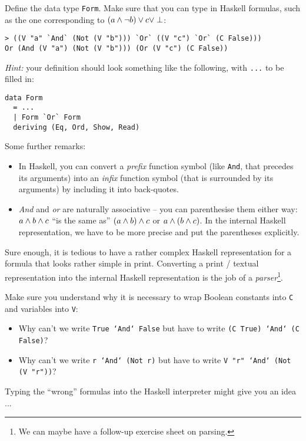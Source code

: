 \documentclass[english]{article}
\begin{document}
\begin{exo}\label{exo:formula_representation}
Define the data type \texttt{Form}. Make sure that you can type in Haskell
formulas, such as the one
corresponding to $(a \land \lnot b) \lor c \lor \perp$:
\begin{lstlisting}
> ((V "a" `And` (Not (V "b"))) `Or` ((V "c") `Or` (C False)))
Or (And (V "a") (Not (V "b"))) (Or (V "c") (C False))
\end{lstlisting}

\emph{Hint:} your definition should look something like the following, with \texttt{...} to
be filled in:
\begin{lstlisting}
data Form
  = ...
  | Form `Or` Form
  deriving (Eq, Ord, Show, Read)
\end{lstlisting}
\end{exo}
Some further remarks:
\begin{itemize}
\item In Haskell, you can convert a \emph{prefix} function symbol (like
  \texttt{And}, that precedes its arguments) into an \emph{infix} function
  symbol (that is surrounded by its arguments) by including it into
  back-quotes. 
\item \emph{And} and \emph{or} are naturally associative -- you can parenthesise
  them either way: $a \land b \land c$ ``is the same as'' $(a \land b) \land c$ or
  $a \land (b \land c)$. In the internal Haskell representation, we have to be
  more precise and put the parentheses explicitly.
\end{itemize}

Sure enough, it is tedious to have a rather complex Haskell representation for
a formula that looks rather simple in print. Converting a print / textual
representation into the internal Haskell representation is the job of a
\emph{parser}\footnote{We can maybe have a follow-up exercise sheet on
  parsing.}.

\begin{exo}\label{exo:const_var_constructors}
Make sure you understand why it is necessary to wrap Boolean constants into
\texttt{C} and variables into \texttt{V}:
\begin{itemize}
\item Why can't we write \texttt{True `And` False} but have to write
  \texttt{(C True) `And` (C False)}? 
\item Why can't we write \texttt{r `And` (Not r)} but have to write
  \texttt{V "r" `And` (Not (V "r"))}? 
\end{itemize}
Typing the ``wrong'' formulas into the Haskell interpreter might give you an
idea ...
\end{exo}
\end{document}
